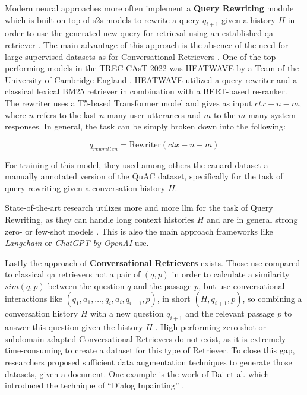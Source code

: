 Modern neural approaches more often implement a \textbf{Query Rewriting} module which is built on top of \gls{s2s}-models to rewrite a query $q_{i+1}$ given a history $H$ in order to use the generated new query for retrieval using an established \gls{qa} retriever \cite{owoicho_trec_2022}. The main advantage of this approach is the absence of the need for large supervised datasets as for Conversational Retrievers \cite{dai_dialog_2022}. One of the top performing models in the TREC CAsT 2022 was HEATWAVE by a Team of the University of Cambridge England \cite{liusie_university_nodate}. HEATWAVE utilized a query rewriter and a classical lexical BM25 retriever in combination with a BERT-based re-ranker. The rewriter uses a T5-based Transformer model and gives as input $ctx-n-m$, where $n$ refers to the last $n$-many user utterances and $m$ to the $m$-many system responses. In general, the task can be simply broken down into the following:

\begin{equation}
    q_{rewritten} = \text{Rewriter}(ctx-n-m)
\end{equation}

For training of this model, they used among others the canard dataset \cite{elgohary_can_2019} a manually annotated version of the QuAC dataset, specifically for the task of query rewriting given a conversation history $H$.

State-of-the-art research utilizes more and more \gls{llm} for the task of Query Rewriting, as they can handle long context histories $H$ and are in general strong zero- or few-shot models \cite{mao_large_2023}. This is also the main approach frameworks like \textit{Langchain} \cite{noauthor_question_nodate} or \textit{ChatGPT by OpenAI} \cite{noauthor_chatgpt_2023} use. 


Lastly the approach of \textbf{Conversational Retrievers} exists. Those use compared to classical \gls{qa} retrievers not a pair of $(q,p)$ in order to calculate a similarity $sim(q,p)$ between the question $q$ and the passage $p$, but use conversational interactions like $(q_1, a_1, \dots, q_i, a_i, q_{i+1}, p)$, in short $(H, q_{i+1}, p)$, so combining a conversation history $H$ with a new question $q_{i+1}$ and the relevant passage $p$ to answer this question given the history $H$ \cite{gao_neural_2022,dai_dialog_2022}. High-performing zero-shot or subdomain-adapted Conversational Retrievers do not exist, as it is extremely time-consuming to create a dataset for this type of Retriever. To close this gap, researchers proposed sufficient data augmentation techniques to generate those datasets, given a document. One example is the work of Dai et al. \cite{dai_dialog_2022} which introduced the technique of \enquote{Dialog Inpainting} \cite{dai_dialog_2022}.  


